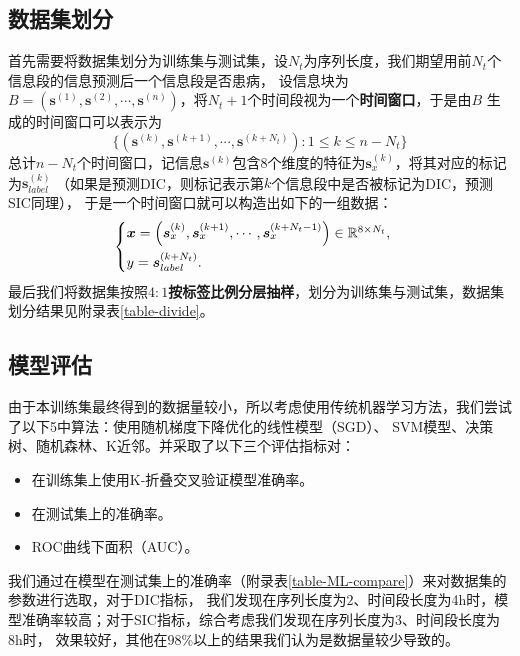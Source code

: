 \documentclass[12pt, a4paper, oneside]{ctexart}
\numberwithin{equation}{section}  %
\let\leq=\leqslant %
\def\bd{\boldsymbol}        %
\def\R{\mathbb{R}}          %
\def\add{\vspace{1ex}}      %
\begin{document}
\subsection{数据集划分}
首先需要将数据集划分为训练集与测试集，设$N_t$为序列长度，我们期望用前$N_t$个信息段的信息预测后一个信息段是否患病，
设信息块为$B = (\bd{s}^{(1)}, \bd{s}^{(2)},\cdots,\bd{s}^{(n)})$，将$N_t+1$个时间段视为一个\textbf{时间窗口}，于是由$B$
生成的时间窗口可以表示为
\begin{equation*}
    \{(\bd{s}^{(k)},\bd{s}^{(k+1)},\cdots,\bd{s}^{(k+N_t)}):1\leq k\leq n-N_t\}
\end{equation*}
总计$n-N_t$个时间窗口，记信息$\bd{s}^{(k)}$包含$8$个维度的特征为$\bd{s}_x^{(k)}$，将其对应的标记为$\bd{s}_{label}^{(k)}$
（如果是预测DIC，则标记表示第$k$个信息段中是否被标记为DIC，预测SIC同理），
于是一个时间窗口就可以构造出如下的一组数据：
\begin{equation*}
    \begin{cases}
        \bd{x} = \left(\bd{s}_x^{(k)},\bd{s}_x^{(k+1)},\cdots,\bd{s}_x^{(k+N_t-1)}\right)\in \R^{8\times N_{t}},\add\\
        y = \bd{s}_{label}^{(k+N_t)}.
    \end{cases}
\end{equation*}
最后我们将数据集按照$4:1$\textbf{按标签比例分层抽样}，划分为训练集与测试集，数据集划分结果见附录表\ref{table-divide}。
\subsection{模型评估}
由于本训练集最终得到的数据量较小，所以考虑使用传统机器学习方法，我们尝试了以下5中算法：使用随机梯度下降优化的线性模型（SGD）、
SVM模型、决策树、随机森林、K近邻。并采取了以下三个评估指标对：
\begin{itemize}
    \item 在训练集上使用K-折叠交叉验证模型准确率。
    \item 在测试集上的准确率。
    \item ROC曲线下面积（AUC）。
\end{itemize}
我们通过在模型在测试集上的准确率（附录表\ref{table-ML-compare}）来对数据集的参数进行选取，对于DIC指标，
我们发现在序列长度为$2$、时间段长度为4h时，模型准确率较高；对于SIC指标，综合考虑我们发现在序列长度为$3$、时间段长度为8h时，
效果较好，其他在$98\%$以上的结果我们认为是数据量较少导致的。
\end{document}
